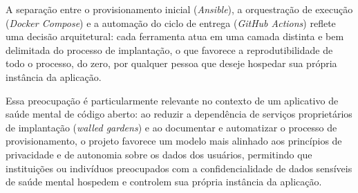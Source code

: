 A separação entre o provisionamento inicial (\textit{Ansible}), a orquestração de
execução (\textit{Docker Compose}) e a automação do ciclo de
entrega (\textit{GitHub Actions}) reflete uma decisão arquitetural:
cada ferramenta atua em uma camada distinta e bem delimitada do processo
de implantação, o que favorece a reprodutibilidade de todo o processo,
do zero, por qualquer pessoa que deseje hospedar sua própria instância da aplicação.

Essa preocupação é particularmente relevante no contexto de um
aplicativo de saúde mental de código aberto: ao reduzir a dependência
de serviços proprietários de implantação (\textit{walled gardens}) e
ao documentar e automatizar o processo de provisionamento, o projeto
favorece um modelo mais alinhado aos princípios de privacidade e de
autonomia sobre os dados dos usuários, permitindo que instituições ou
indivíduos preocupados com a confidencialidade de dados sensíveis de
saúde mental hospedem e controlem sua própria instância da aplicação.
